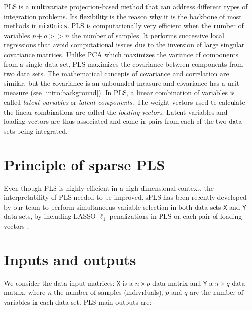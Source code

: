 \documentclass[]{book}
\begin{document}
PLS is a multivariate projection-based method that can address different types of integration problems. Its flexibility is the reason why it is the backbone of most methods in \texttt{mixOmics}. PLS is computationally very efficient when the number of variables \(p + q >> n\) the number of samples. It performs successive local regressions that avoid computational issues due to the inversion of large singular covariance matrices. Unlike PCA which maximizes the variance of components from a single data set, PLS maximizes the covariance between components from two data sets. The mathematical concepts of covariance and correlation are similar, but the covariance is an unbounded measure and covariance has a unit measure (see \ref{intro:background}). In PLS, a linear combination of variables is called \emph{latent variables} or \emph{latent components}. The weight vectors used to calculate the linear combinations are called the \emph{loading vectors}. Latent variables and loading vectors are thus associated and come in pairs from each of the two data sets being integrated.

\hypertarget{principle-of-sparse-pls}{%
\section{Principle of sparse PLS}\label{principle-of-sparse-pls}}

Even though PLS is highly efficient in a high dimensional context, the interpretability of PLS needed to be improved. sPLS has been recently developed by our team to perform simultaneous variable selection in both data sets \texttt{X} and \texttt{Y} data sets, by including LASSO \(\ell_1\) penalizations in PLS on each pair of loading vectors \citep{Lec08}.

\hypertarget{inputs-and-outputs-1}{%
\section{Inputs and outputs}\label{inputs-and-outputs-1}}

We consider the data input matrices: \texttt{X} is a \(n \times p\) data matrix and \texttt{Y} a \(n \times q\) data matrix, where \(n\) the number of samples (individuals), \(p\) and \(q\) are the number of variables in each data set. PLS main outputs are:
\end{document}
